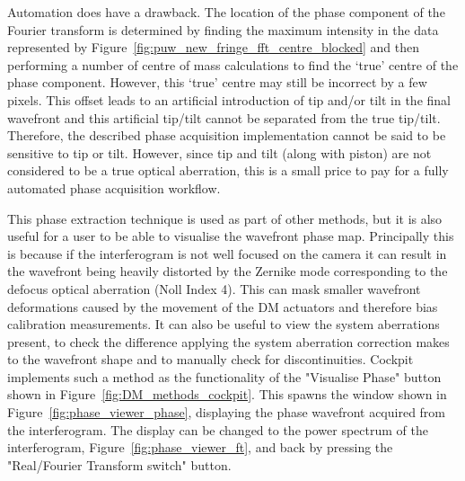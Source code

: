 Automation does have a drawback. The location of the phase component of the Fourier transform is determined by finding the maximum intensity in the data represented by Figure~\ref{fig:puw_new_fringe_fft_centre_blocked} and then performing a number of centre of mass calculations to find the `true' centre of the phase component. However, this `true' centre may still be incorrect by a few pixels. This offset leads to an artificial introduction of tip and/or tilt in the final wavefront and this artificial tip/tilt cannot be separated from the true tip/tilt. Therefore, the described phase acquisition implementation cannot be said to be sensitive to tip or tilt. However, since tip and tilt (along with piston) are not considered to be a true optical aberration, this is a small price to pay for a fully automated phase acquisition workflow.

This phase extraction technique is used as part of other methods, but it is also useful for a user to be able to visualise the wavefront phase map. Principally this is because if the interferogram is not well focused on the camera it can result in the wavefront being heavily distorted by the Zernike mode corresponding to the defocus optical aberration (Noll Index 4). This can mask smaller wavefront deformations caused by the movement of the DM actuators and therefore bias calibration measurements. It can also be useful to view the system aberrations present, to check the difference applying the system aberration correction makes to the wavefront shape and to manually check for discontinuities. Cockpit implements such a method as the functionality of the "Visualise Phase" button shown in Figure~\ref{fig:DM_methods_cockpit}. This spawns the window shown in Figure~\ref{fig:phase_viewer_phase}, displaying the phase wavefront acquired from the interferogram. The display can be changed to the power spectrum of the interferogram, Figure~\ref{fig:phase_viewer_ft}, and back by pressing the "Real/Fourier Transform switch" button. 

